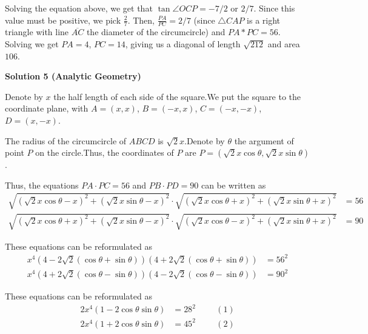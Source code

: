 \begin{enumerate}
 Solving the equation above, we get that $\tan{\angle{OCP}} = -7/2$ or $2/7$. Since this value must be positive, we pick $\frac{2}{7}$. Then, $\frac{PA}{PC} = 2/7$ (since $\triangle CAP$ is a right triangle with line $\overline{AC}$ the diameter of the circumcircle) and $PA * PC = 56$. Solving we get $PA = 4$, $PC = 14$, giving us a diagonal of length $\sqrt{212}$ and area $\boxed{106}$.

 



\textbf{Solution 5 (Analytic Geometry)}

Denote by $x$ the half length of each side of the square.We put the square to the coordinate plane, with $A = \left( x, x \right)$, $B = \left( - x , x \right)$, $C = \left( - x , - x \right)$, $D = \left( x , - x \right)$.

 The radius of the circumcircle of $ABCD$ is $\sqrt{2} x$.Denote by $\theta$ the argument of point $P$ on the circle.Thus, the coordinates of $P$ are $P = \left( \sqrt{2} x \cos \theta , \sqrt{2} x \sin \theta \right)$.

 Thus, the equations $PA \cdot PC = 56$ and $PB \cdot PD = 90$ can be written as
 \begin{align*} \sqrt{\left( \sqrt{2} x \cos \theta - x \right)^2 + \left( \sqrt{2} x \sin \theta - x \right)^2} \cdot \sqrt{\left( \sqrt{2} x \cos \theta + x \right)^2 + \left( \sqrt{2} x \sin \theta + x \right)^2} & = 56 \\ \sqrt{\left( \sqrt{2} x \cos \theta + x \right)^2 + \left( \sqrt{2} x \sin \theta - x \right)^2} \cdot \sqrt{\left( \sqrt{2} x \cos \theta - x \right)^2 + \left( \sqrt{2} x \sin \theta + x \right)^2} & = 90 \end{align*}


 These equations can be reformulated as
 \begin{align*} x^4 \left( 4 - 2 \sqrt{2} \left( \cos \theta + \sin \theta \right) \right) \left( 4 + 2 \sqrt{2} \left( \cos \theta + \sin \theta \right) \right) & = 56^2  \\ x^4 \left( 4 + 2 \sqrt{2} \left( \cos \theta - \sin \theta \right) \right) \left( 4 - 2 \sqrt{2} \left( \cos \theta - \sin \theta \right) \right) & = 90^2 \end{align*}


 These equations can be reformulated as
 \begin{align*} 2 x^4 \left( 1 - 2 \cos \theta  \sin \theta \right) & = 28^2 \hspace{1cm} (1) \\ 2 x^4 \left( 1 + 2 \cos \theta  \sin \theta \right) & = 45^2 \hspace{1cm} (2) \end{align*}



\end{enumerate}

